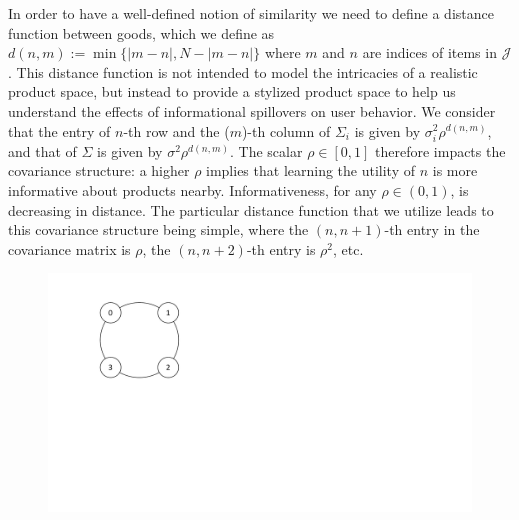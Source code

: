 \documentclass[sigconf]{acmart}
\begin{document}
In order to have a well-defined notion of similarity we need to define a distance function between goods, which we define as $d(n,m):=\min\{ \lvert m - n \rvert ,N - \lvert m - n \rvert \}$ where $m$ and $n$ are indices of items in $\mathcal{J}$. This distance function is not intended to model the intricacies of a realistic product space, but instead to provide a stylized product space to help us understand the effects of informational spillovers on user behavior. We consider that the entry of $n$-th row and the ($m$)-th column of $\Sigma_i$ is given by $\sigma_i^2 \rho^{d(n,m)}$, and that of $\Sigma$ is given by $\sigma^2 \rho^{d(n,m)}$. The scalar $\rho \in [0,1]$ therefore impacts the covariance structure: a higher $\rho$ implies that learning the utility of $n$ is more informative about products nearby. Informativeness, for any $\rho \in (0,1)$, is decreasing in distance. The particular distance function that we utilize leads to this covariance structure being simple, where the $(n,n+1)$-th entry in the covariance matrix is $\rho$, the $(n,n+2)$-th entry is $\rho^2$, etc.
\par
\begin{figure}[t]
\includegraphics[width=.4\linewidth]{Example-Bubbles.pdf}
\label{fig:illustrative_example}
\end{figure}
\end{document}
